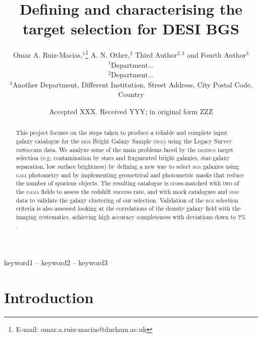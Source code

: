 \documentclass[fleqn,usenatbib]{mnras}
\title[Short title, max. 45 characters]{Defining and characterising the target selection for DESI BGS}
\author[Omar A. Ruiz-Macias et al.]{
Omar A. Ruiz-Macias,$^{1}$\thanks{E-mail: omar.a.ruiz-macias@durham.ac.uk}
A. N. Other,$^{2}$
Third Author$^{2,3}$
and Fourth Author$^{3}$
\\
$^{1}$Department...\\
$^{2}$Department...\\
$^{3}$Another Department, Different Institution, Street Address, City Postal Code, Country
}
\date{Accepted XXX. Received YYY; in original form ZZZ}
\newcommand{\BGS}{\textsc{bgs}\xspace}
\newcommand{\DECam}{\textsc{dec}am\xspace}
\newcommand{\DESI}{\textsc{desi}\xspace}
\newcommand{\DReight}{\textsc{dr8}\xspace}
\newcommand{\GAMA}{\textsc{gama}\xspace}
\newcommand{\GAIA}{\textsc{gaia}\xspace}
\newcommand{\SDSS}{\textsc{sdss}\xspace}
\begin{document}
\label{firstpage}
\pagerange{\pageref{firstpage}--\pageref{lastpage}}
\maketitle

\begin{abstract}
This project focuses on the steps taken to produce a reliable and complete input galaxy catalogue for the \DESI Bright Galaxy Sample (\BGS) using the Legacy Survey \DReight \DECam data. We analyze some of the main problems faced by the \DESI \BGS target selection (e.g. contamination by stars and fragmented bright galaxies, star-galaxy separation, low surface brightness) by defining a new way to select \BGS galaxies using \GAIA photometry and by implementing geometrical and photometric masks that reduce the number of spurious objects. The resulting catalogue is cross-matched with two of the \GAMA fields to assess the redshift success rate, and with mock catalogues and \SDSS data to validate the galaxy clustering of our selection. Validation of the \BGS selection criteria is also assessed looking at the correlations of the density galaxy field with the imaging systematics, achieving high accuracy completeness with deviations down to $7\%$.
\end{abstract}

\begin{keywords}
keyword1 -- keyword2 -- keyword3
\end{keywords}



\section{Introduction}\label{sec:intro} %
\end{document}
